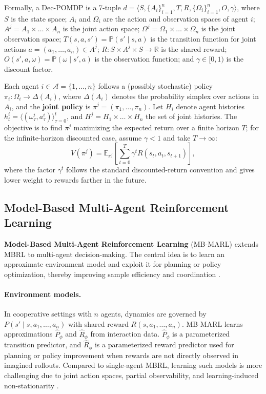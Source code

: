 \documentclass{article}
\theoremstyle{plain}
\theoremstyle{definition}
\theoremstyle{remark}
\begin{document}
Formally, a Dec-POMDP is a 7-tuple
$d = \langle S, \{A_i\}_{i=1}^n, T, R, \{\Omega_i\}_{i=1}^n, O, \gamma \rangle$,
where $S$ is the state space;
$A_i$ and $\Omega_i$ are the action and observation spaces of agent $i$;
$A^j=A_1\times\dots\times A_n$ is the joint action space;
$\Omega^j=\Omega_1\times\dots\times\Omega_n$ is the joint observation space;
$T(s,a,s') = \mathbb{P}(s' \mid s,a)$ is the transition function for joint actions
$a = (a_1,\dots,a_n)\in A^j$;
$R : S \times A^j \times S \rightarrow \mathbb{R}$ is the shared reward;
$O(s',a,\omega) = \mathbb{P}(\omega \mid s',a)$ is the observation function;
and $\gamma \in [0,1)$ is the discount factor.

Each agent $i \in \mathcal{A} = \{1,\dots,n\}$ follows a (possibly stochastic) policy
$\pi_i : \Omega_i \rightarrow \Delta(A_i)$,
where $\Delta(A_i)$ denotes the probability simplex over actions in $A_i$,
and the \textbf{joint policy} is
$\pi^j = (\pi_1,\dots,\pi_n)$.
Let $H_i$ denote agent histories
$h_t^i = \langle (\omega_\tau^i, a_\tau^i) \rangle_{\tau=0}^{t}$,
and $H^j = H_1 \times \dots \times H_n$ the set of joint histories.
The objective is to find $\pi^j$ maximizing the expected return over a finite horizon $T$; for the infinite-horizon discounted case, assume $\gamma < 1$ and take $T\rightarrow\infty$:
\begin{equation}
  V(\pi^j) =
  \mathbb{E}_{\pi^j}
  \left[ \sum_{t=0}^{T} \gamma^t R(s_t, a_t, s_{t+1}) \right],
  \label{eq:expected_return}
\end{equation}
where the factor $\gamma^t$ follows the standard discounted-return convention and gives lower weight to rewards farther in the future.

\subsection{Model-Based Multi-Agent Reinforcement Learning}
\label{sec:mb-marl}

\textbf{Model-Based Multi-Agent Reinforcement Learning} (MB-MARL) extends MBRL to multi-agent decision-making.
The central idea is to learn an approximate environment model
and exploit it for planning or policy optimization,
thereby improving sample efficiency and coordination
\cite{Moerland2023modelbased,Wang2022modelbasedmultiagentreinforcementlearning}.

\paragraph{Environment models.}
In cooperative settings with $n$ agents, dynamics are governed by
$P(s' \mid s, a_1,\dots,a_n)$ with shared reward $R(s,a_1,\dots,a_n)$.
MB-MARL learns approximations
$\hat{P}_\phi$ and $\hat{R}_\phi$ from interaction data.
$\hat{P}_\phi$ is a parameterized transition predictor, and
$\hat{R}_\phi$ is a parameterized reward predictor used for planning or
policy improvement when rewards are not directly observed in imagined rollouts.
Compared to single-agent MBRL, learning such models is more challenging
due to joint action spaces, partial observability, and learning-induced non-stationarity
\cite{Wang2022modelbasedmultiagentreinforcementlearning}.
\end{document}
